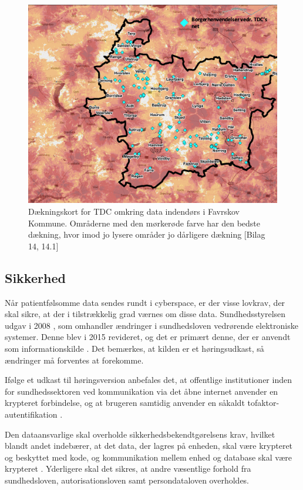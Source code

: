 \begin{figure}[H]
\centering
\includegraphics[width=1\textwidth]{Figurer/Snip20160526_3}
\caption{\label{fig:dkort}Dækningskort for TDC omkring data indendørs i Favrskov Kommune. Områderne med den mørkerøde farve har den bedste dækning, hvor imod jo lysere områder jo dårligere dækning  [Bilag 14, 14.1]}
\end{figure}

\subsection{Sikkerhed}
Når patientfølsomme data sendes rundt i cyberspace, er der visse lovkrav, der skal sikre, at der i tilstrækkelig grad værnes om disse data.
Sundhedsstyrelsen udgav i 2008 , som omhandler ændringer i sundhedsloven vedrørende elektroniske systemer. Denne blev i 2015 revideret, og det er primært denne, der er anvendt som informationskilde \cite{vogi}. Det bemærkes, at kilden er et høringsudkast, så ændringer må forventes at forekomme.

Ifølge et udkast til høringsversion  anbefales det, at offentlige institutioner inden for sundhedssektoren ved kommunikation via det åbne internet anvender en krypteret forbindelse, og at brugeren samtidig anvender en såkaldt tofaktor-autentifikation \cite{vogi}.

Den dataansvarlige skal overholde sikkerhedsbekendtgørelsens krav, hvilket blandt andet indebærer, at det data, der lagres på enheden, skal være krypteret og beskyttet med kode, og kommunikation mellem enhed og database skal være krypteret \cite{shbekendt}. Yderligere skal det sikres, at andre væsentlige forhold fra sundhedsloven, autorisationsloven samt persondataloven overholdes. 

